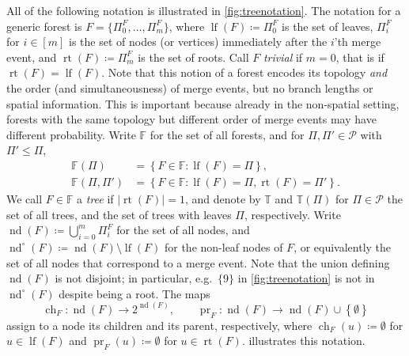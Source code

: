 \documentclass[reqno,draft]{amsart}
\numberwithin{equation}{section}
\theoremstyle{plain}
\theoremstyle{remark}
\DeclareMathOperator{\ch}{ch}
\DeclareMathOperator{\pr}{pr}
\newcommand{\fpart}{\Pi} %
\DeclareMathOperator{\lf}{lf}
\DeclareMathOperator{\rt}{rt}
\DeclareMathOperator{\nd}{nd}
\begin{document}
All of the following notation is illustrated in \cref{fig:treenotation}. The notation for a generic forest is $F = \{\fpart_0^F, \ldots ,\fpart_m^F\}$, where $\lf(F) \coloneqq \fpart_0^F$ is the set of leaves, $\fpart_i^F$ for $i \in [m]$ is the set of nodes (or vertices) immediately after the $i$'th merge event, and $\rt(F) \coloneqq \fpart_m^F$ is the set of roots. Call $F$ \emph{trivial} if $m = 0$, that is if $\rt(F) = \lf(F)$. Note that this notion of a forest encodes its topology \emph{and} the order (and simultaneousness) of merge events, but no branch lengths or spatial information. This is important because already in the non-spatial setting, forests with the same topology but different order of merge events may have different probability.
Write $\mathbb{F}$ for the set of all forests, and for $\fpart,\fpart'\in \mathcal{P}$ with $\fpart' \le \fpart$,
\begin{align*}
    \mathbb{F}(\fpart) &= \left\{ F\in \mathbb{F}\colon \lf(F) = \fpart \right\},\\
    \mathbb{F}(\fpart,\fpart') &= \left\{ F\in \mathbb{F}\colon \lf(F) = \fpart, \rt(F) = \fpart' \right\} .
\end{align*}
We call $F\in \mathbb{F}$ a \emph{tree} if $|\rt(F)| = 1$, and denote by $\mathbb{T}$ and $\mathbb{T}(\fpart)$ for $\fpart \in \mathcal{P}$ the set of all trees, and the set of trees with leaves $\fpart$, respectively.
Write $\nd(F) \coloneqq \bigcup_{i=0} ^m \fpart_i^F$ for the set of all nodes, and $\nd^\circ (F) \coloneqq \nd(F) \setminus \lf(F)$ for the non-leaf nodes of $F$, or equivalently the set of all nodes that correspond to a merge event. Note that the union defining $\nd(F)$ is not disjoint; in particular, e.g.\ $\{9\}$ in \cref{fig:treenotation} is not in $\nd^\circ (F)$ despite being a root.
The maps \[
    \ch_F \colon \nd(F) \to 2^{\nd(F)},\qquad \pr_F\colon \nd(F) \to \nd(F) \cup \left\{ \emptyset  \right\}
\] assign to a node its children and its parent, respectively, where $\ch_F(u) \coloneqq \emptyset $ for $u\in \lf(F)$ and $\pr_F(u) \coloneqq \emptyset $ for $u\in \rt(F)$.  illustrates this notation.
\end{document}
